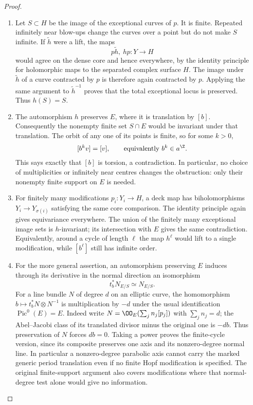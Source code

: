 \begin{proof}
\begin{enumerate}[label=\arabic*.,leftmargin=*]
\item Let $S\subset H$ be the image of the exceptional curves of $p$.
It is finite. Repeated infinitely near blow-ups change the curves
over a point but do not make $S$ infinite.
If $\widetilde h$ were a lift, the maps
\[
 p\widetilde h,\ hp:Y\longrightarrow H
\]
would agree on the dense core and hence everywhere, by the identity
principle for holomorphic maps to the separated complex surface $H$.
The image under $\widetilde h$ of a curve contracted by $p$ is
therefore again contracted by $p$. Applying the same argument to
$\widetilde h^{-1}$ proves that the total exceptional locus is
preserved. Thus $h(S)=S$.

\item The automorphism $h$ preserves $E$, where it is translation by
$[b]$. Consequently the nonempty finite set $S\cap E$ would be
invariant under that translation. The orbit of any one of its
points is finite, so for some $k>0$,
\[
 [b^k v]=[v],\qquad\text{equivalently } b^k\in a^\Z.
\]
This says exactly that $[b]$ is torsion, a contradiction.
In particular, no choice of multiplicities or infinitely near
centres changes the obstruction: only their nonempty finite
support on $E$ is needed.

\item For finitely many modifications $p_i:Y_i\to H$, a deck map has biholomorphisms
$Y_i\to Y_{\sigma(i)}$ satisfying the same core comparison.
The identity principle again gives equivariance everywhere.
The union of the finitely many exceptional image sets is
$h$-invariant; its intersection with $E$ gives the same contradiction.
Equivalently, around a cycle of length $\ell$ the map $h^\ell$
would lift to a single modification, while $[b^\ell]$ still has
infinite order.

\item For the more general assertion, an automorphism preserving $E$ induces through its derivative in the normal
direction an isomorphism
\[
 t_b^*N_{E/S}\simeq N_{E/S}.
\]
For a line bundle $N$ of degree $d$ on an elliptic curve, the
homomorphism $b\mapsto t_b^*N\otimes N^{-1}$ is multiplication
by $-d$ under the usual identification $\operatorname{Pic}^0(E)=E$.
Indeed write $N=\OO_E(\sum_j n_j[p_j])$ with
$\sum_j n_j=d$; the Abel--Jacobi class of its translated divisor
minus the original one is $-d b$.
Thus preservation of $N$ forces $d b=0$.
Taking a power proves the finite-cycle version, since its composite
preserves one axis and its nonzero-degree normal line.
In particular a nonzero-degree parabolic axis cannot carry the
marked generic period translation even if no finite Hopf
modification is specified. The original finite-support argument
also covers modifications where that normal-degree test alone
would give no information.


\end{enumerate}
\end{proof}
